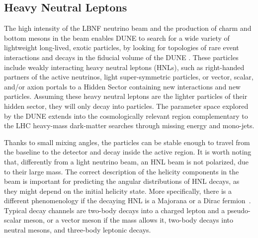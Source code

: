 \subsection{Heavy Neutral Leptons}
The high intensity of the LBNF neutrino beam and the production of charm and bottom mesons in the beam enables DUNE to search for a wide variety of lightweight long-lived, exotic particles, by looking for topologies of rare event interactions and decays in the fiducial volume of the DUNE . These particles include weakly interacting heavy neutral leptons (HNLs), such as right-handed partners of the active neutrinos, light super-symmetric particles, or vector, scalar, and/or axion portals to a Hidden Sector containing new interactions and new particles. 
Assuming these heavy neutral leptons are the lighter particles of their hidden sector, they will only decay into  particles. The parameter space explored by the DUNE  extends into the cosmologically relevant region complementary to the LHC heavy-mass dark-matter searches through missing energy and mono-jets.

Thanks to small mixing angles, the particles can be stable enough to travel from the baseline to the detector and decay inside the active region.
It is worth noting that, differently from a light neutrino beam, an HNL beam is not polarized, due to their large mass.
The correct description of the helicity components in the beam is important for predicting the angular distributions
of HNL decays, as they might depend on the initial helicity state.
More specifically, there is a different phenomenology if the decaying HNL is a Majorana or a Dirac fermion~\cite{Balantekin:2018ukw, Ballett:2019bgd}.
Typical decay channels are two-body decays into a charged lepton and a pseudo-scalar meson, or a vector meson if
the mass allows it, two-body decays into neutral mesons, and three-body leptonic decays.

